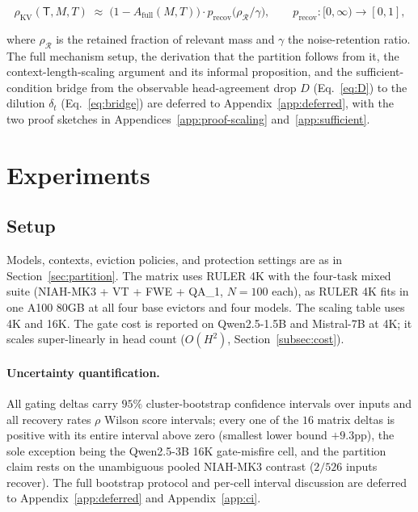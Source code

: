 \documentclass{article}
\begin{document}
\begin{equation}
\label{eq:scaling}
\rho_{\mathrm{KV}}(\mathsf{T}, M, T) \;\approx\;
\bigl(1 - A_{\mathrm{full}}(M, T)\bigr) \cdot p_{\mathrm{recov}}\bigl(\rho_{\mathcal{R}} / \gamma\bigr),
\qquad p_{\mathrm{recov}}: [0, \infty) \to [0, 1],
\end{equation}

where $\rho_{\mathcal{R}}$ is the retained fraction of relevant mass and
$\gamma$ the noise-retention ratio. The full mechanism setup, the
derivation that the partition follows from it, the context-length-scaling
argument and its informal proposition, and the sufficient-condition bridge
from the observable head-agreement drop $D$ (Eq.~\eqref{eq:D}) to the
dilution $\delta_t$ (Eq.~\eqref{eq:bridge}) are deferred to
Appendix~\ref{app:deferred}, with the two proof sketches in
Appendices~\ref{app:proof-scaling} and~\ref{app:sufficient}.

\section{Experiments}
\label{sec:experiments}

\subsection{Setup}

Models, contexts, eviction policies, and protection settings are as in
Section~\ref{sec:partition}. The matrix uses RULER 4K with the four-task
mixed suite (NIAH-MK3 + VT + FWE + QA\_1, $N = 100$ each), as RULER 4K
fits in one A100 80GB at all four base evictors and four models. The
scaling table uses 4K and 16K. The gate cost is reported on Qwen2.5-1.5B and
Mistral-7B at 4K; it scales super-linearly in head count ($O(H^2)$,
Section~\ref{subsec:cost}).

\paragraph{Uncertainty quantification.} All gating deltas carry $95\%$
cluster-bootstrap confidence intervals over inputs and all recovery rates
$\rho$ Wilson score intervals; every one of the $16$ matrix deltas is
positive with its entire interval above zero (smallest lower bound $+9.3$pp),
the sole exception being the Qwen2.5-3B 16K gate-misfire cell, and the
partition claim rests on the unambiguous pooled NIAH-MK3 contrast ($2/526$
inputs recover). The full bootstrap protocol and per-cell interval discussion
are deferred to Appendix~\ref{app:deferred} and Appendix~\ref{app:ci}.
\end{document}

